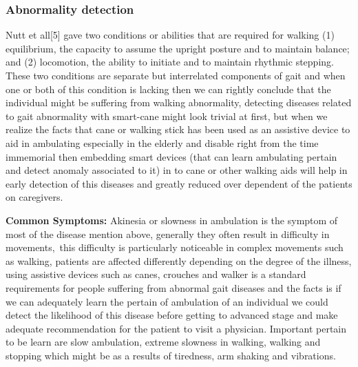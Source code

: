 \documentclass[a4paper, parskip=full]{scrartcl}
\begin{document}
\newpage
\subsubsection*{Abnormality detection} Nutt et all[5] gave two conditions or abilities that are required for walking (1) equilibrium, the capacity to assume the upright posture and to maintain balance; and (2) locomotion, the ability to initiate and to maintain rhythmic stepping. These two conditions are separate but interrelated components of gait and when one or both of this condition is lacking then we can rightly conclude that the individual might be suffering from walking abnormality, detecting diseases related to gait abnormality with smart-cane might look trivial at first, but when we realize the facts that cane or walking stick has been used as an assistive device to aid in ambulating especially in the elderly and disable right from the time immemorial then embedding smart devices (that can learn ambulating pertain and detect anomaly associated to it) in to cane or other walking aids will help in early detection of this diseases and greatly reduced over dependent of the patients on caregivers.

\textbf{Common Symptoms:}  Akinesia or slowness in ambulation is the symptom of most of the disease mention above, generally they often result in difficulty in movements, this difficulty is particularly noticeable in complex movements such as walking, patients are affected differently depending on the degree of the illness, using assistive devices such as canes, crouches and walker is a standard requirements for people suffering from abnormal gait diseases and  the facts is if we can adequately learn the pertain of ambulation of an individual we could detect the likelihood of this disease before getting to advanced stage and make adequate recommendation for the patient to visit a physician. Important pertain to be learn are slow ambulation, extreme slowness in walking, walking and stopping which might be as a results of tiredness, arm shaking and vibrations.
\end{document}
